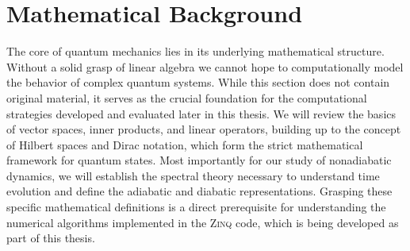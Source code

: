 \chapter{Mathematical Background}\label{chp:mathematical_background}
The core of quantum mechanics lies in its underlying mathematical structure. Without a solid grasp of linear algebra we cannot hope to computationally model the behavior of complex quantum systems. While this section does not contain original material, it serves as the crucial foundation for the computational strategies developed and evaluated later in this thesis. We will review the basics of vector spaces, inner products, and linear operators, building up to the concept of Hilbert spaces and Dirac notation, which form the strict mathematical framework for quantum states. Most importantly for our study of nonadiabatic dynamics, we will establish the spectral theory necessary to understand time evolution and define the adiabatic and diabatic representations. Grasping these specific mathematical definitions is a direct prerequisite for understanding the numerical algorithms implemented in the \textsc{Zinq} code, which is being developed as part of this thesis.\supercite{10.5281/zenodo.18386143}



